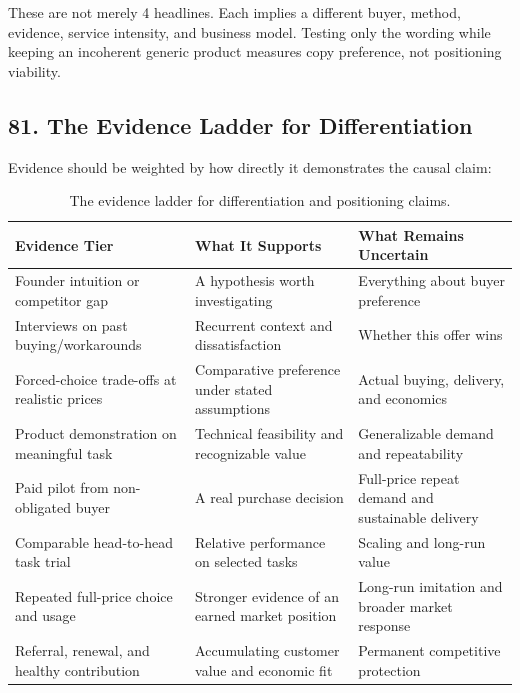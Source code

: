 These are not merely 4 headlines. Each implies a different buyer, method, evidence, service intensity, and business model. Testing only the wording while keeping an incoherent generic product measures copy preference, not positioning viability.

\subsection*{81. The Evidence Ladder for Differentiation}

Evidence should be weighted by how directly it demonstrates the causal claim:

\begin{table}[t]
\centering
\small
\begin{tabularx}{\textwidth}{>{\raggedright\arraybackslash}p{4.2cm} >{\raggedright\arraybackslash}X >{\raggedright\arraybackslash}X}
\toprule
\textbf{Evidence Tier} & \textbf{What It Supports} & \textbf{What Remains Uncertain} \\
\midrule
Founder intuition or competitor gap & A hypothesis worth investigating & Everything about buyer preference \\
Interviews on past buying/workarounds & Recurrent context and dissatisfaction & Whether this offer wins \\
Forced-choice trade-offs at realistic prices & Comparative preference under stated assumptions & Actual buying, delivery, and economics \\
Product demonstration on meaningful task & Technical feasibility and recognizable value & Generalizable demand and repeatability \\
Paid pilot from non-obligated buyer & A real purchase decision & Full-price repeat demand and sustainable delivery \\
Comparable head-to-head task trial & Relative performance on selected tasks & Scaling and long-run value \\
Repeated full-price choice and usage & Stronger evidence of an earned market position & Long-run imitation and broader market response \\
Referral, renewal, and healthy contribution & Accumulating customer value and economic fit & Permanent competitive protection \\
\bottomrule
\end{tabularx}
\caption{The evidence ladder for differentiation and positioning claims.}
\label{tab:ch8-evidence-ladder}
\end{table}

